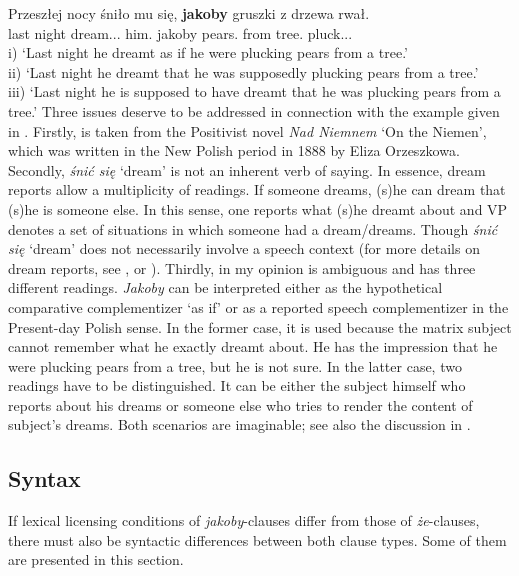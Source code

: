 \documentclass[output=paper
,modfonts
,nonflat]{langsci/langscibook}
\begin{document}
\ea \gll Przeszłej nocy śniło mu się, \textbf{jakoby} gruszki z drzewa rwał. \label{gruszki} \\
		last night dream.{\lptcp}.{\sg}.{\n} him.{\dat} {} jakoby pears.{\acc} from tree.{\gen} pluck.{\lptcp}.{\sg}.{\fem} \\
	\glt	i) `Last night he dreamt as if he were plucking pears from a tree.' \\
	\glt	ii) `Last night he dreamt that he was supposedly plucking pears from a tree.' \\
	\glt	iii) `Last night he is supposed to have dreamt that he was plucking pears from a tree.'   
\z
Three issues deserve to be addressed in connection with the example given in . Firstly,  is taken from the Positivist novel \emph{Nad Niemnem} `On the Niemen', which was written in the New Polish period in 1888 by Eliza Orzeszkowa. Secondly, \emph{śnić się} `dream' is not an inherent verb of saying. In essence, dream reports allow a multiplicity of readings. If someone dreams, (s)he can dream that (s)he is someone else. In this sense, one reports what (s)he dreamt about and VP denotes a set of situations in which someone had a dream\slash dreams. Though  \emph{śnić się} `dream' does not necessarily involve a speech context (for more details on dream reports, see \textcite{Shanon1980}, \textcite{Percus-Sauerland2003} or \textcite{Kauf2017}). Thirdly, in my opinion  is ambiguous and has three different readings. \emph{Jakoby} can be interpreted either as the hypothetical comparative complementizer `as if' or as a reported speech complementizer in the Present-day Polish sense. In the former case, it is used because the matrix subject cannot remember what he exactly dreamt about. He has the impression that he were plucking pears from a tree, but he is not sure. In the latter case, two readings have to be distinguished. It can be either the subject himself who reports about his dreams or someone else who tries to render the content of subject's dreams. Both scenarios are imaginable; see also the discussion in .

\subsection{Syntax}

If lexical licensing conditions of \emph{jakoby}-clauses differ from those of \emph{że}-clauses, there must also be syntactic differences between both clause types. Some of them are presented in this section.
\end{document}
